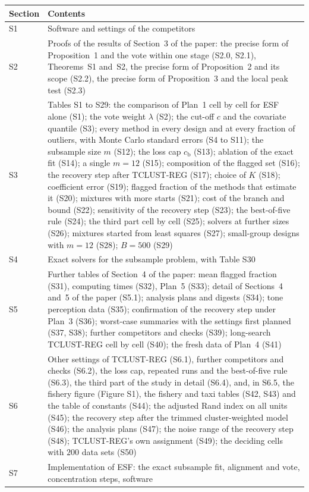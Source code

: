 \documentclass[11pt,a4paper]{article}
\begin{document}
\begin{center}\small
\begin{tabular}{lp{11.5cm}}
\toprule
Section & Contents \\
\midrule
S1 & Software and settings of the competitors \\
S2 & Proofs of the results of Section~3 of the paper: the precise form of Proposition~1 and the vote within one stage (S2.0, S2.1), Theorems~S1 and~S2, the precise form of Proposition~2 and its scope (S2.2), the precise form of Proposition~3 and the local peak test (S2.3) \\
S3 & Tables S1 to S29: the comparison of Plan~1 cell by cell for ESF alone (S1); the vote weight $\lambda$ (S2); the cut-off $c$ and the covariate quantile (S3); every method in every design and at every fraction of outliers, with Monte Carlo standard errors (S4 to S11); the subsample size $m$ (S12); the loss cap $c_{\mathrm b}$ (S13); ablation of the exact fit (S14); a single $m=12$ (S15); composition of the flagged set (S16); the recovery step after TCLUST-REG (S17); choice of $K$ (S18); coefficient error (S19); flagged fraction of the methods that estimate it (S20); mixtures with more starts (S21); cost of the branch and bound (S22); sensitivity of the recovery step (S23); the best-of-five rule (S24); the third part cell by cell (S25); solvers at further sizes (S26); mixtures started from least squares (S27); small-group designs with $m=12$ (S28); $B=500$ (S29) \\
S4 & Exact solvers for the subsample problem, with Table S30 \\
S5 & Further tables of Section~4 of the paper: mean flagged fraction (S31), computing times (S32), Plan~5 (S33); detail of Sections~4 and~5 of the paper (S5.1); analysis plans and digests (S34); tone perception data (S35); confirmation of the recovery step under Plan~3 (S36); worst-case summaries with the settings first planned (S37, S38); further competitors and checks (S39); long-search TCLUST-REG cell by cell (S40); the fresh data of Plan~4 (S41) \\
S6 & Other settings of TCLUST-REG (S6.1), further competitors and checks (S6.2), the loss cap, repeated runs and the best-of-five rule (S6.3), the third part of the study in detail (S6.4), and, in S6.5, the fishery figure (Figure S1), the fishery and taxi tables (S42, S43) and the table of constants (S44); the adjusted Rand index on all units (S45); the recovery step after the trimmed cluster-weighted model (S46); the analysis plans (S47); the noise range of the recovery step (S48); TCLUST-REG's own assignment (S49); the deciding cells with $200$ data sets (S50) \\
S7 & Implementation of ESF: the exact subsample fit, alignment and vote, concentration steps, software \\
\bottomrule
\end{tabular}
\end{center}
\end{document}
